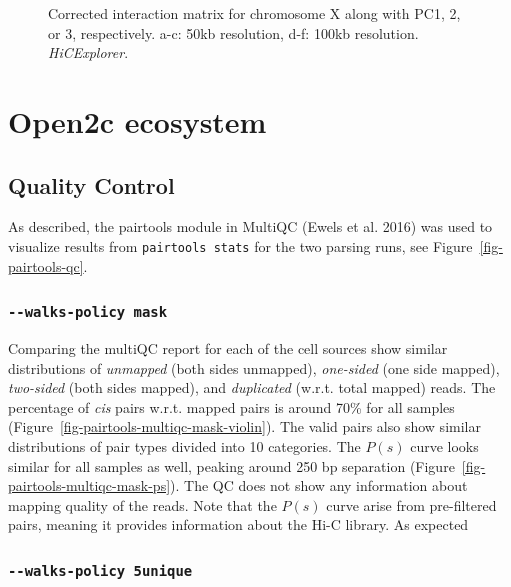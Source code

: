 \documentclass[
  11pt,
  a4paper,
]{scrbook}
\let\oldemph\emph
\renewcommand\emph[1]{\oldemph{\color{gray}#1}}
\begin{document}
\begin{figure}
\begin{minipage}{0.33\linewidth}
{}

\subcaption{\label{fig-explorer-pc3-100kb}}

\end{minipage}%

\caption{\label{fig-explorer-pca}Corrected interaction matrix for
chromosome X along with PC1, 2, or 3, respectively. a-c: 50kb
resolution, d-f: 100kb resolution. \emph{HiCExplorer}.}

\end{figure}%

\section{Open2c ecosystem}\label{open2c-ecosystem}

\subsection{Quality Control}\label{quality-control-1}

As described, the pairtools module in MultiQC (Ewels et al. 2016) was
used to visualize results from \texttt{pairtools\ stats} for the two
parsing runs, see Figure~\ref{fig-pairtools-qc}.

\subsubsection{\texorpdfstring{\texttt{-\/-walks-policy\ mask}}{-\/-walks-policy mask}}\label{walks-policy-mask}

Comparing the multiQC report for each of the cell sources show similar
distributions of \emph{unmapped} (both sides unmapped), \emph{one-sided}
(one side mapped), \emph{two-sided} (both sides mapped), and
\emph{duplicated} (w.r.t. total mapped) reads. The percentage of
\emph{cis} pairs w.r.t. mapped pairs is around 70\% for all samples
(Figure~\ref{fig-pairtools-multiqc-mask-violin}). The valid pairs also
show similar distributions of pair types divided into 10 categories. The
\(P(s)\) curve looks similar for all samples as well, peaking around 250
bp separation (Figure~\ref{fig-pairtools-multiqc-mask-ps}). The QC does
not show any information about mapping quality of the reads. Note that
the \(P(s)\) curve arise from pre-filtered pairs, meaning it provides
information about the Hi-C library. As expected

\subsubsection{\texorpdfstring{\texttt{-\/-walks-policy\ 5unique}}{-\/-walks-policy 5unique}}\label{walks-policy-5unique}
\end{document}
